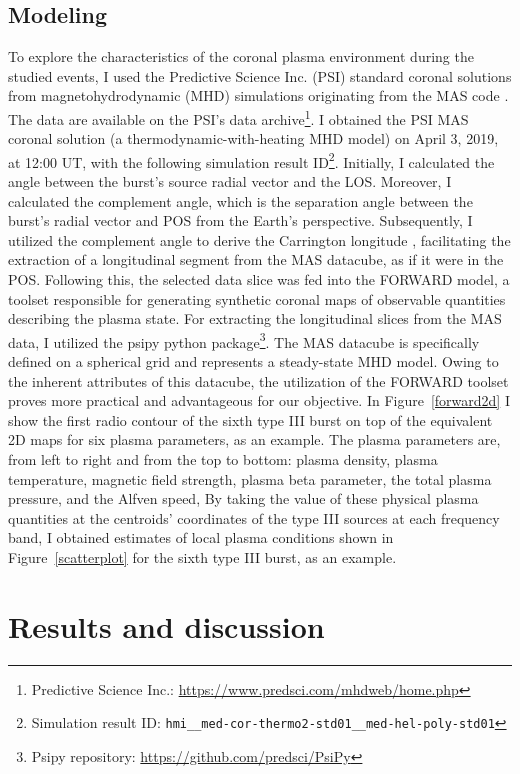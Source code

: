 \subsection{Modeling}
To explore the characteristics of the coronal plasma environment during the studied events, I used the Predictive Science Inc. (PSI) standard coronal solutions from magnetohydrodynamic (MHD) simulations originating from the MAS code \citep{mhd_1999}. The data are available on the PSI's data archive\footnote{Predictive Science Inc.: \url{https://www.predsci.com/mhdweb/home.php}}. I obtained the PSI MAS coronal solution (a thermodynamic-with-heating MHD model) on April 3, 2019, at 12:00 UT, with the following simulation result ID\footnote{Simulation result ID: \texttt{hmi\_\_med-cor-thermo2-std01\_\_med-hel-poly-std01}}.
Initially, I calculated the angle between the burst's source radial vector and the LOS. Moreover, I calculated the complement angle, which is the separation angle between the burst's radial vector and POS from the Earth's perspective.
Subsequently, I utilized the complement angle to derive the Carrington longitude \citep{thompson_2006}, facilitating the extraction of a longitudinal segment from the MAS datacube, as if it were in the POS. Following this, the selected data slice was fed into the FORWARD model, a toolset responsible for generating synthetic coronal maps of observable quantities describing the plasma state.
For extracting the longitudinal slices from the MAS data, I utilized the psipy python package\footnote{Psipy repository: \url{https://github.com/predsci/PsiPy}}.
The MAS datacube is specifically defined on a spherical grid and represents a steady-state MHD model. Owing to the inherent attributes of this datacube, the utilization of the FORWARD toolset proves more practical and advantageous for our objective.
In Figure~\ref{forward2d} I show the first radio contour of the sixth type III burst on top of the equivalent 2D maps for six plasma parameters, as an example. The plasma parameters are, from left to right and from the top to bottom: plasma density, plasma temperature, magnetic field strength, plasma beta parameter, the total plasma pressure, and the Alfven speed, By taking the value of these physical plasma quantities at the centroids' coordinates of the type III sources at each frequency band, I obtained estimates of local plasma conditions shown in Figure~\ref{scatterplot} for the sixth type III burst, as an example.

\section{Results and discussion}
\label{sec_ch3_results}
